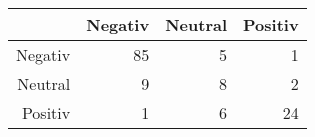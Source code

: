 \begin{table}[ht]
\centering
\begin{tabular}{rrrr}
  \hline
 & Negativ & Neutral & Positiv \\ 
  \hline
Negativ &  85 &   5 &   1 \\ 
  Neutral &   9 &   8 &   2 \\ 
  Positiv &   1 &   6 &  24 \\ 
   \hline
\end{tabular}
\end{table}
